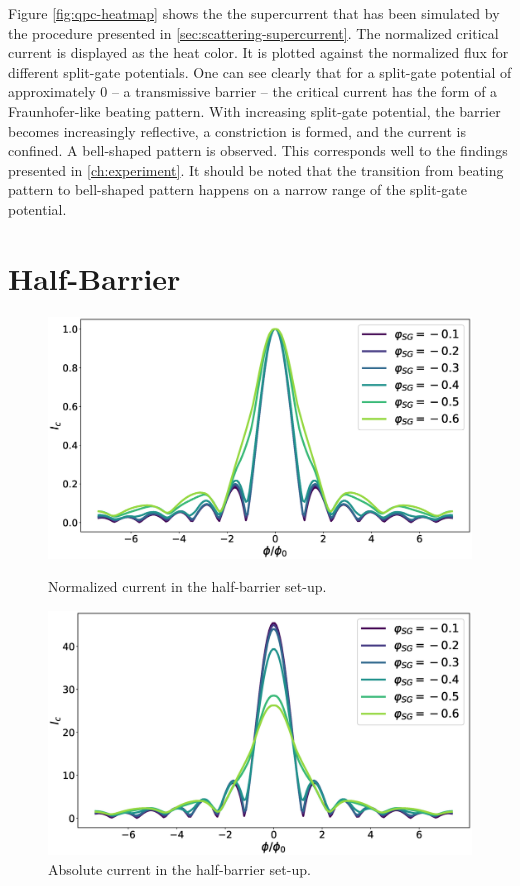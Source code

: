 Figure \ref{fig:qpc-heatmap} shows the the supercurrent that has been simulated by the procedure presented in \ref{sec:scattering-supercurrent}. The normalized critical current is displayed as the heat color. It is plotted against the normalized flux for different split-gate potentials. One can see clearly that for a split-gate potential of approximately 0 -- a transmissive barrier -- the critical current has the form of a Fraunhofer-like beating pattern. With increasing split-gate potential, the barrier becomes increasingly reflective, a constriction is formed, and the current is confined. A bell-shaped pattern is observed. This corresponds well to the findings presented in \ref{ch:experiment}. It should be noted that the transition from beating pattern to bell-shaped pattern happens on a narrow range of the split-gate potential.

\section{Half-Barrier}

\begin{figure}[ht]
\begin{minipage}[b]{0.49\linewidth}
\centering
\includegraphics[width=\textwidth]{figure/numericalmodel/hb_upper}
\caption{Normalized current in the half-barrier set-up.} \label{fig:hb-norm}
\end{minipage}
\begin{minipage}[b]{0.49\linewidth}
\centering
\includegraphics[width=\textwidth]{figure/numericalmodel/hb_upper_abs}
\caption{Absolute current in the half-barrier set-up.}\label{fig:hb-abs}
\end{minipage}
\end{figure}

